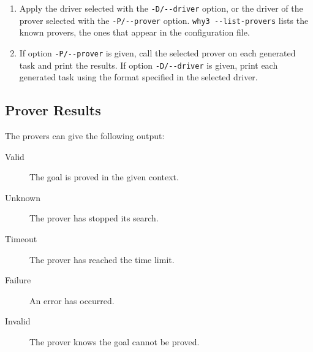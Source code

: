 \begin{enumerate}
\item Apply the driver selected with the \verb|-D/--driver| option,
  or the driver of the prover selected with the \verb|-P/--prover|
  option. \verb|why3 --list-provers| lists the known provers, \ie the ones
  that appear in the configuration file.
\item If option \verb|-P/--prover| is given, call the selected prover
  on each generated task and print the results. If option
  \verb|-D/--driver| is given, print each generated task using
  the format specified in the selected driver.
\end{enumerate}


\subsection{Prover Results}
The provers can give the following output:
\begin{description}
\item[Valid] The goal is proved in the given context.
\item[Unknown] The prover has stopped its search.
\item[Timeout] The prover has reached the time limit.
\item[Failure] An error has occurred.
\item[Invalid] The prover knows the goal cannot be proved.
\end{description}


